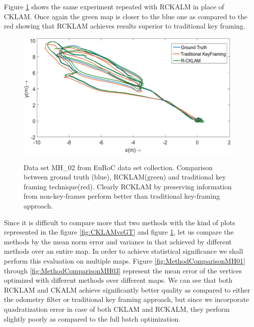 Figure \ref{fig:RCKLAMvsGT} shows the same experiment repeated with RCKALM in place of CKLAM. Once again the green map is closer to the blue one as compared to the red showing that RCKLAM achieves results superior to traditional key framing. 

\begin{figure}
	\centering
		\includegraphics[width=1.00\textwidth]{images/RCKLAMvsGT.png}
	\label{fig:RCKLAMvsGT}
  \caption{Data set MH\_02 from EuRoC \cite{Burri25012016} data set collection. Comparison between ground truth (blue), RCKLAM(green) and traditional key framing technique(red). Clearly RCKLAM by preserving information from non-key-frames perform better than traditional key-framing approach.}
\end{figure}


Since it is difficult to compare more that two methods with the kind of plots represented in the figure \ref{fig:CKLAMvsGT} and figure \ref{fig:RCKLAMvsGT}, let us compare the methods by the mean norm error and variance in that achieved by different methods over an entire map. In order to achieve statistical significance we shall perform this evaluation on multiple maps. Figure \ref{fig:MethodComparisonMH01} through \ref{fig:MethodComparisonMH03} represent the mean error of the vertices optimized with different methods over different maps. We can see that both RCKLAM and CKALM achieve significantly better quality as compared to either the odometry filter or traditional key framing approach, but since we incorporate quadratization error in case of both CKLAM and RCKALM, they perform slightly poorly as compared to the full batch optimization.  

